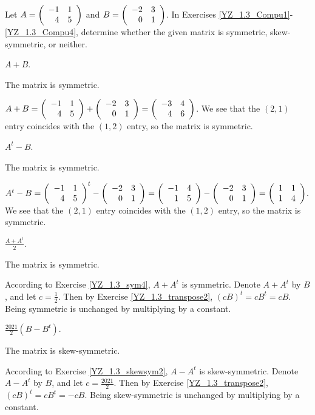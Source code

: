 \documentclass{ximera}
\begin{document}
Let $A=\left(\begin{array}{rrrrrrrrrrrrrrrrrr} -1&1\\4&5 \end{array}\right)$ and $B=\left(\begin{array}{rrrrrrrrrrrrrrrrrr} -2&3\\0&1 \end{array}\right)$. In Exercises \ref{YZ_1.3_Compu1}-\ref{YZ_1.3_Compu4}, determine whether the given matrix is symmetric, skew-symmetric, or neither.

\begin{exercise}\label{YZ_1.3_Compu1}
$A+B$.

\begin{solution}
\ans The matrix is symmetric.

\soln
$A+B=\left(\begin{array}{rrrrrrrrrrrrrrrrrr} -1&1\\4&5 \end{array}\right)+\left(\begin{array}{rrrrrrrrrrrrrrrrrr} -2&3\\0&1 \end{array}\right)=\left(\begin{array}{rrrrrrrrrrrrrrrrrr} -3&4\\4&6 \end{array}\right)$. We see that the $(2,1)$ entry coincides with the $(1,2)$ entry, so the matrix is symmetric.
\end{solution}
\end{exercise}

\begin{exercise}\label{YZ_1.3_Compu2}
$A^t-B$.

\begin{solution}
\ans The matrix is symmetric.

\soln
$A^t-B=\left(\begin{array}{rrrrrrrrrrrrrrrrrr} -1&1\\4&5 \end{array}\right)^t-\left(\begin{array}{rrrrrrrrrrrrrrrrrr} -2&3\\0&1 \end{array}\right)=\left(\begin{array}{rrrrrrrrrrrrrrrrrr} -1&4\\1&5 \end{array}\right)-\left(\begin{array}{rrrrrrrrrrrrrrrrrr} -2&3\\0&1 \end{array}\right)=\left(\begin{array}{rrrrrrrrrrrrrrrrrr} 1&1\\1&4 \end{array}\right)$. We see that the $(2,1)$ entry coincides with the $(1,2)$ entry, so the matrix is symmetric.
\end{solution}
\end{exercise}

\begin{exercise}\label{YZ_1.3_Compu3}
$\frac{A+A^t}{2}$.

\begin{solution}
\ans The matrix is symmetric.

\soln According to Exercise \ref{YZ_1.3_sym4}, $A+A^t$ is symmetric. Denote $A+A^t$ by $B$, and let $c=\frac12$. Then by Exercise \ref{YZ_1.3_transpose2}, $(cB)^t=cB^t=cB$. Being symmetric is unchanged by multiplying by a constant.
\end{solution}
\end{exercise}

\begin{exercise}\label{YZ_1.3_Compu4}
$\frac{2021}{2}(B-B^t)$.

\begin{solution}
\ans The matrix is skew-symmetric.

\soln According to Exercise \ref{YZ_1.3_skewsym2}, $A-A^t$ is skew-symmetric. Denote $A-A^t$ by $B$, and let $c=\frac{2021}{2}$. Then by Exercise \ref{YZ_1.3_transpose2}, $(cB)^t=cB^t=-cB$. Being skew-symmetric is unchanged by multiplying by a constant.

\end{solution}
\end{exercise}
\end{document}
